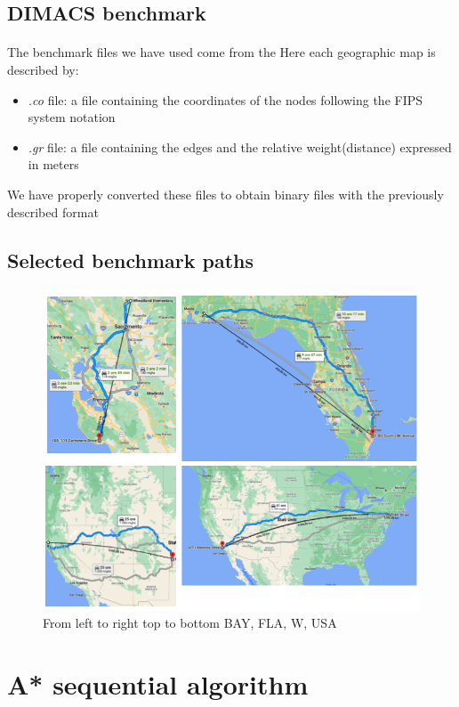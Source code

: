 \documentclass[12pt]{beamer}
\begin{document}
	\subsection{DIMACS benchmark}
	\begin{frame}{\secname}
		\framesubtitle{\subsecname}
		The benchmark files we have used come from the 
		Here each geographic map is described by:
		\begin{itemize}
			\item \textit{.co} file: a file containing the coordinates of the nodes following the FIPS system notation
			\item \textit{.gr} file: a file containing the edges and the relative weight(distance) expressed in meters
		\end{itemize}
		We have properly converted these files to obtain binary files with the previously described format
	\end{frame}
	\subsection{Selected benchmark paths}
	\begin{frame}{\secname}
		\framesubtitle{\subsecname}
		\begin{figure}[ht!]
			\centering
			\includegraphics[width=0.65\linewidth]{others/google_maps.png}
			\caption{From left to right top to bottom BAY, FLA, W, USA}
			\label{testpaths}
		\end{figure}
	\end{frame}
	\section{A* sequential algorithm}
\end{document}
